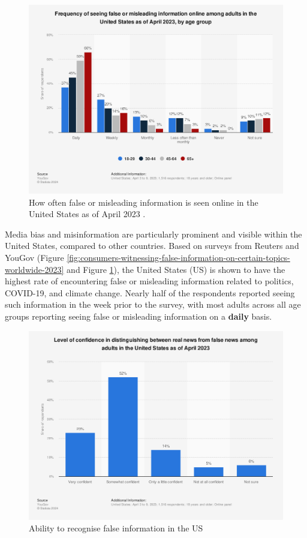\begin{figure}[htbp]
    \centering
    \includegraphics[width=0.7\linewidth]{images/statistic_id1462057_frequency-of-seeing-false-information-online-in-the-us-2023-by-age-group.png}
    \caption{How often false or misleading information is seen online in the United States as of April 2023 \cite{yougov-2023-frequency}.}
    \label{fig:frequency-of-seeing-false-information-online-in-the-us-2023-by-age-group}
\end{figure}

Media bias and misinformation are particularly prominent and visible within the United States, compared to other countries. Based on surveys from Reuters \cite{reuters-2023-false-info} and YouGov \cite{yougov-2023-frequency} (Figure \ref{fig:consumers-witnessing-false-information-on-certain-topics-worldwide-2023} and Figure \ref{fig:frequency-of-seeing-false-information-online-in-the-us-2023-by-age-group}), the United States (US) is shown to have the highest rate of encountering false or misleading information related to politics, COVID-19, and climate change. Nearly half of the respondents reported seeing such information in the week prior to the survey, with most adults across all age groups reporting seeing false or misleading information on a \textbf{daily} basis.

\begin{figure}[htbp]
    \centering
    \includegraphics[width=0.7\linewidth]{images/statistic_id657090_ability-to-recognize-false-information-and-news-in-the-us-2023.png}
    \caption{Ability to recognise false information in the US \cite{yougov-2023-confidence}}
    \label{fig:ability-to-recognize-false-information-and-news-in-the-us-2023}
\end{figure}


